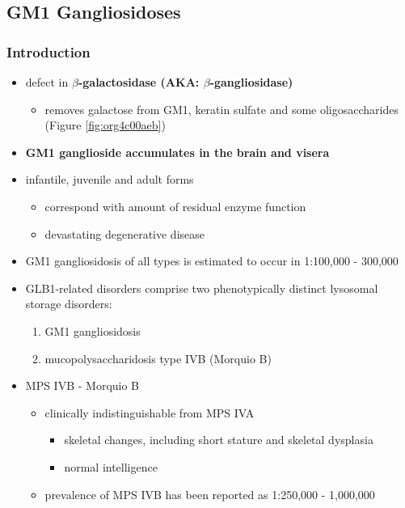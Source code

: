 \documentclass[12pt]{scrartcl}
\begin{document}
\subsection{GM1 Gangliosidoses}
\label{sec:org6ebc4de}
\subsubsection{Introduction}
\label{sec:org152f25f}
\begin{itemize}
\item defect in \textbf{\(\beta\)-galactosidase (AKA: \(\beta\)-gangliosidase)}
\begin{itemize}
\item removes galactose from GM1, keratin sulfate and some oligosaccharides (Figure \ref{fig:org4c00aeb})
\end{itemize}
\item \textbf{GM1 ganglioside accumulates in the brain and visera}
\item infantile, juvenile and adult forms
\begin{itemize}
\item correspond with amount of residual enzyme function
\item devastating degenerative disease
\end{itemize}
\item GM1 gangliosidosis of all types is estimated to occur in 1:100,000 - 300,000
\item GLB1-related disorders comprise two phenotypically distinct lysosomal storage disorders:
\begin{enumerate}
\item GM1 gangliosidosis
\item mucopolysaccharidosis type IVB (Morquio B)
\end{enumerate}
\item MPS IVB - Morquio B
\begin{itemize}
\item clinically indistinguishable from MPS IVA 
\begin{itemize}
\item skeletal changes, including short stature and skeletal dysplasia
\item normal intelligence
\end{itemize}
\item prevalence of MPS IVB has been reported as 1:250,000 - 1,000,000
\end{itemize}
\end{itemize}
\end{document}
